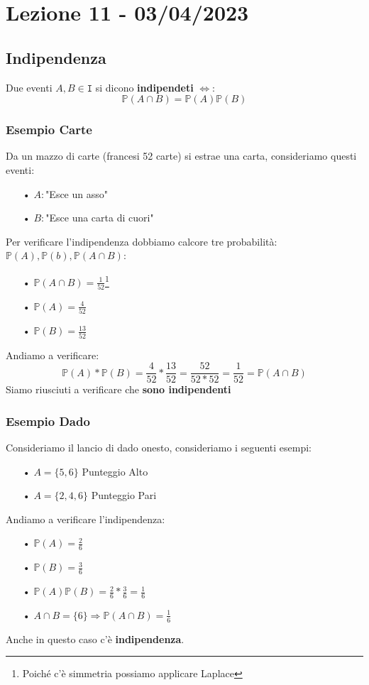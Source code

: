 \section{Lezione 11 - 03/04/2023}

\subsection{Indipendenza}
Due eventi $A,B \in \mathtt{I}$ si dicono \textbf{indipendeti} $\Leftrightarrow$:
$$ \mathbb{P}(A \cap B) = \mathbb{P}(A) \mathbb{P}(B) $$

\subsubsection{Esempio Carte}
Da un mazzo di carte (francesi 52 carte) si estrae una carta, consideriamo questi eventi:
\begin{itemize}
\item[•] $A:$"Esce un asso"
\item[•] $B:$"Esce una carta di cuori"
\end{itemize}
Per verificare l'indipendenza dobbiamo calcore tre probabilità: $\mathbb{P}(A),\mathbb{P}(b),\mathbb{P}(A \cap B)$:
\begin{itemize}
\item[•]$\mathbb{P}(A \cap B) = \frac{1}{52}$\footnote{Poiché c'è simmetria possiamo applicare Laplace}
\item[•]$\mathbb{P}(A) = \frac{4}{52}$
\item[•]$\mathbb{P}(B) = \frac{13}{52}$
\end{itemize}
Andiamo a verificare:
$$ \mathbb{P}(A) * \mathbb{P}(B) = \frac{4}{52}*\frac{13}{52} = \frac{52}{52*52} = \frac{1}{52} = \mathbb{P}(A \cap B) $$
Siamo riusciuti a verificare che \textbf{sono indipendenti}

\subsubsection{Esempio Dado}
Consideriamo il lancio di dado onesto, consideriamo i seguenti esempi:
\begin{itemize}
\item[•]$A=\{5,6\}$ Punteggio Alto
\item[•]$A=\{2,4,6\}$ Punteggio Pari
\end{itemize}
Andiamo a verificare l'indipendenza:
\begin{itemize}
\item[•]$\mathbb{P}(A) = \frac{2}{6}$
\item[•]$\mathbb{P}(B) = \frac{3}{6}$
\item[•]$\mathbb{P}(A)\mathbb{P}(B) = \frac{2}{6}*\frac{3}{6} = \frac{1}{6}$
\item[•]$A \cap B = \{6\} \Rightarrow \mathbb{P}(A \cap B) = \frac{1}{6}$
\end{itemize}
Anche in questo caso c'è \textbf{indipendenza}.

